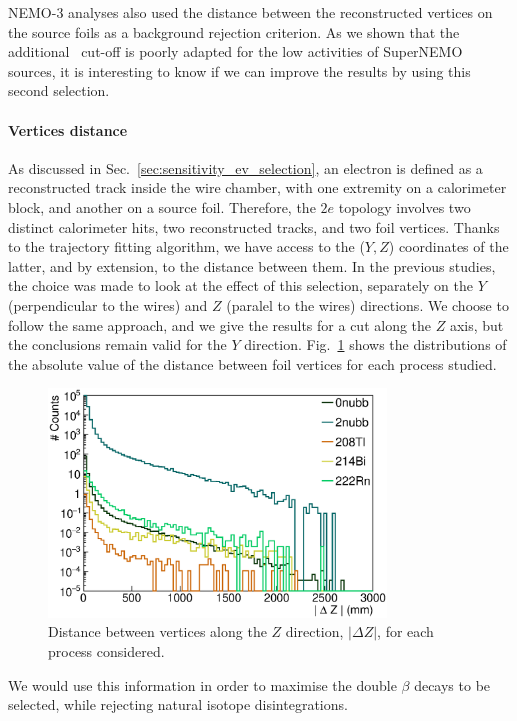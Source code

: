 NEMO-$3$ analyses also used the distance between the reconstructed vertices on the source foils as a background rejection criterion.
As we shown that the additional \Pint\ cut-off is poorly adapted for the low activities of SuperNEMO sources, it is interesting to know if we can improve the results by using this second selection.

\paragraph{Vertices distance}
As discussed in Sec.~\ref{sec:sensitivity_ev_selection}, an electron is defined as a reconstructed track inside the wire chamber, with one extremity on a calorimeter block, and another on a source foil.
Therefore, the $2e$ topology involves two distinct calorimeter hits, two reconstructed tracks, and two foil vertices.
Thanks to the trajectory fitting algorithm, we have access to the ($Y,Z$) coordinates of the latter, and by extension, to the distance between them.
In the previous studies, the choice was made to look at the effect of this selection, separately on the $Y$ (perpendicular to the wires) and $Z$ (paralel to the wires) directions.
We choose to follow the same approach, and we give the results for a cut along the $Z$ axis, but the conclusions remain valid for the $Y$ direction.
Fig.~\ref{fig:vertex_dist} shows the distributions of the absolute value of the distance between foil vertices for each process studied.
\begin{figure}[h]
  \centering
  \includegraphics[width=0.8\textwidth]{Sensitivity/fig_sensitivity/Vertex_distance.eps}
  \caption{Distance between vertices along the $Z$ direction, $|\Delta Z|$, for each process considered.
    \label{fig:vertex_dist}}
\end{figure}
We would use this information in order to maximise the double $\beta$ decays to be selected, while rejecting natural isotope disintegrations.

